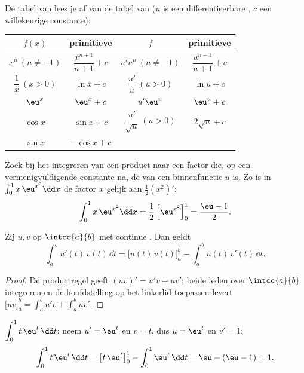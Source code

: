De tabel van  lees je af van de tabel van 
($u$ is een differentieerbare , $c$ een willekeurige constante):
\begin{center}
\renewcommand{\arraystretch}{1.7}
\begin{tabular}{c|c||c|c}
$f(x)$ & primitieve & $f$ & primitieve \\
\hline
$x^n \ (n \neq -1)$ & $\dfrac{x^{n+1}}{n+1} + c$ &
$u'u^n \ (n \neq -1)$ & $\dfrac{u^{n+1}}{n+1} + c$\\
$\dfrac1x \ (x > 0)$ & $\ln x + c$ &
$\dfrac{u'}{u} \ (u > 0)$ & $\ln u + c$\\
$\eu^x$ & $\eu^x + c$ &
$u'\eu^u$ & $\eu^u + c$\\
$\cos x$ & $\sin x + c$ &
$\dfrac{u'}{\sqrt u} \ (u>0)$ & $2\sqrt u + c$\\
$\sin x$ & $-\cos x + c$ & &
\end{tabular}
\end{center}

\begin{method}\label{met:g12:integ:uprime}
Zoek bij het integreren van een product naar een factor die, op een
vermenigvuldigende constante na, de  van een binnenfunctie $u$ is.
Zo is in $\int_0^1 x\,\eu^{x^2}\dd x$ de factor $x$ gelijk aan
$\frac12 (x^2)'$:
\[
\int_0^1 x\,\eu^{x^2}\dd x = \frac12\left[\eu^{x^2}\right]_0^1
= \frac{\eu - 1}{2}.
\]
\end{method}

\begin{theorem}\label{thm:g12:integ:ibp}
Zij $u, v$  op $\intcc{a}{b}$ met continue . Dan
geldt
\[
\int_a^b u'(t)\,v(t)\,\dd t
= \bigl[u(t)\,v(t)\bigr]_a^b - \int_a^b u(t)\,v'(t)\,\dd t .
\]
\end{theorem}

\begin{proof}
De productregel geeft $(uv)' = u'v + uv'$; beide leden over $\intcc{a}{b}$
integreren en de hoofdstelling op het linkerlid toepassen levert
$\bigl[uv\bigr]_a^b = \int_a^b u'v + \int_a^b uv'$.
\end{proof}

\begin{example}\label{ex:g12:integ:ibp}
$\displaystyle\int_0^1 t\,\eu^{t}\,\dd t$: neem $u' = \eu^t$ en $v = t$, dus
$u = \eu^t$ en $v' = 1$:
\[
\int_0^1 t\,\eu^t\,\dd t = \bigl[t\,\eu^t\bigr]_0^1 - \int_0^1 \eu^t\,\dd t
= \eu - (\eu - 1) = 1 .
\]
\end{example}

